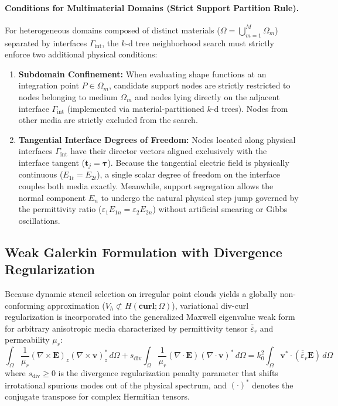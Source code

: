 \documentclass[11pt,a4paper]{article}
\begin{document}
\paragraph{Conditions for Multimaterial Domains (Strict Support Partition Rule).}
For heterogeneous domains composed of distinct materials ($\Omega = \bigcup_{m=1}^M \Omega_m$) separated by interfaces $\Gamma_{\mathrm{int}}$, the $k$-d tree neighborhood search must strictly enforce two additional physical conditions:
\begin{enumerate}
  \item \textbf{Subdomain Confinement:} When evaluating shape functions at an integration point $P \in \Omega_m$, candidate support nodes are strictly restricted to nodes belonging to medium $\Omega_m$ and nodes lying directly on the adjacent interface $\Gamma_{\mathrm{int}}$ (implemented via material-partitioned $k$-d trees). Nodes from other media are strictly excluded from the search.
  \item \textbf{Tangential Interface Degrees of Freedom:} Nodes located along physical interfaces $\Gamma_{\mathrm{int}}$ have their director vectors aligned exclusively with the interface tangent ($\mathbf{t}_j = \boldsymbol{\tau}$). Because the tangential electric field is physically continuous ($E_{1t} = E_{2t}$), a single scalar degree of freedom on the interface couples both media exactly. Meanwhile, support segregation allows the normal component $E_n$ to undergo the natural physical step jump governed by the permittivity ratio ($\varepsilon_1 E_{1n} = \varepsilon_2 E_{2n}$) without artificial smearing or Gibbs oscillations.
\end{enumerate}

\subsection{Weak Galerkin Formulation with Divergence Regularization}
Because dynamic stencil selection on irregular point clouds yields a globally non-conforming approximation ($V_h \not\subset H(\mathbf{curl}; \Omega)$), variational div-curl regularization \cite{mesquita_eabe} is incorporated into the generalized Maxwell eigenvalue weak form for arbitrary anisotropic media characterized by permittivity tensor $\overline{\overline{\varepsilon}}_r$ and permeability $\mu_r$:
\begin{equation}
\int_{\Omega} \frac{1}{\mu_r} (\nabla \times \mathbf{E})_z (\nabla \times \mathbf{v})_z^* \, d\Omega + s_{\mathrm{div}} \int_{\Omega} \frac{1}{\mu_r} (\nabla \cdot \mathbf{E}) (\nabla \cdot \mathbf{v})^* \, d\Omega = k_0^2 \int_{\Omega} \mathbf{v}^* \cdot (\overline{\overline{\varepsilon}}_r \mathbf{E}) \, d\Omega
\end{equation}
where $s_{\mathrm{div}} \ge 0$ is the divergence regularization penalty parameter that shifts irrotational spurious modes out of the physical spectrum, and $(\cdot)^*$ denotes the conjugate transpose for complex Hermitian tensors.
\end{document}
